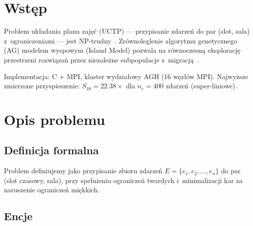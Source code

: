 \documentclass{common/sprawozdanie-agh}
\begin{document}
\stronatytulowa{}
\tableofcontents
\newpage

\section{Wstęp}

Problem układania planu zajęć (UCTP) --- przypisanie zdarzeń do par (slot, sala) z~ograniczeniami --- jest NP-trudny~\cite{banczyk}. Zrównoleglenie algorytmu genetycznego (AG) modelem wyspowym (Island Model) pozwala na równoczesną eksplorację przestrzeni rozwiązań przez niezależne subpopulacje z~migracją~\cite{faris}.

Implementacja: C + MPI, klaster wydziałowy AGH (16 węzłów MPI). Najwyższe zmierzone przyspieszenie: $S_{16}=22.38\times$ dla $n_e=400$ zdarzeń (super-liniowe).

\section{Opis problemu}

\subsection{Definicja formalna}

Problem definiujemy jako przypisanie zbioru zdarzeń $E = \{e_1, e_2, \ldots, e_n\}$ do par (slot czasowy, sala), przy spełnieniu ograniczeń twardych i~minimalizacji kar za naruszenie ograniczeń miękkich.

\subsection{Encje}
\end{document}

